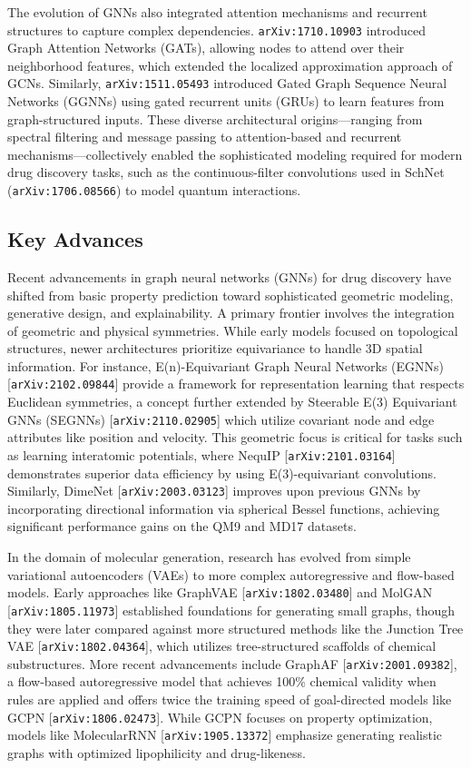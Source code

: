 \documentclass[11pt]{article}
\begin{document}
The evolution of GNNs also integrated attention mechanisms and recurrent structures to capture complex dependencies. \texttt{arXiv:1710.10903} introduced Graph Attention Networks (GATs), allowing nodes to attend over their neighborhood features, which extended the localized approximation approach of GCNs. Similarly, \texttt{arXiv:1511.05493} introduced Gated Graph Sequence Neural Networks (GGNNs) using gated recurrent units (GRUs) to learn features from graph-structured inputs. These diverse architectural origins—ranging from spectral filtering and message passing to attention-based and recurrent mechanisms—collectively enabled the sophisticated modeling required for modern drug discovery tasks, such as the continuous-filter convolutions used in SchNet (\texttt{arXiv:1706.08566}) to model quantum interactions.

\subsection{Key Advances}

Recent advancements in graph neural networks (GNNs) for drug discovery have shifted from basic property prediction toward sophisticated geometric modeling, generative design, and explainability. A primary frontier involves the integration of geometric and physical symmetries. While early models focused on topological structures, newer architectures prioritize equivariance to handle 3D spatial information. For instance, E(n)-Equivariant Graph Neural Networks (EGNNs) [\texttt{arXiv:2102.09844}] provide a framework for representation learning that respects Euclidean symmetries, a concept further extended by Steerable E(3) Equivariant GNNs (SEGNNs) [\texttt{arXiv:2110.02905}] which utilize covariant node and edge attributes like position and velocity. This geometric focus is critical for tasks such as learning interatomic potentials, where NequIP [\texttt{arXiv:2101.03164}] demonstrates superior data efficiency by using E(3)-equivariant convolutions. Similarly, DimeNet [\texttt{arXiv:2003.03123}] improves upon previous GNNs by incorporating directional information via spherical Bessel functions, achieving significant performance gains on the QM9 and MD17 datasets.

In the domain of molecular generation, research has evolved from simple variational autoencoders (VAEs) to more complex autoregressive and flow-based models. Early approaches like GraphVAE [\texttt{arXiv:1802.03480}] and MolGAN [\texttt{arXiv:1805.11973}] established foundations for generating small graphs, though they were later compared against more structured methods like the Junction Tree VAE [\texttt{arXiv:1802.04364}], which utilizes tree-structured scaffolds of chemical substructures. More recent advancements include GraphAF [\texttt{arXiv:2001.09382}], a flow-based autoregressive model that achieves 100\% chemical validity when rules are applied and offers twice the training speed of goal-directed models like GCPN [\texttt{arXiv:1806.02473}]. While GCPN focuses on property optimization, models like MolecularRNN [\texttt{arXiv:1905.13372}] emphasize generating realistic graphs with optimized lipophilicity and drug-likeness.
\end{document}

